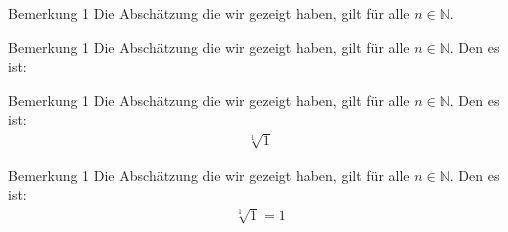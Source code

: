 \documentclass[10pt]{beamer}
\def\bN{\mathbb{N}}
\begin{document}



\begin{frame}{Bemerkung 1}
    Die Abschätzung die wir gezeigt haben, gilt für alle \( n \in \bN \). 
\end{frame}



\begin{frame}{Bemerkung 1}
    Die Abschätzung die wir gezeigt haben, gilt für alle \( n \in \bN \). Den es ist: 
\end{frame}



\begin{frame}{Bemerkung 1}
    Die Abschätzung die wir gezeigt haben, gilt für alle \( n \in \bN \). Den es ist: 
    \begin{align*}
        \sqrt[1]{1}
    \end{align*}
\end{frame}



\begin{frame}{Bemerkung 1}
    Die Abschätzung die wir gezeigt haben, gilt für alle \( n \in \bN \). Den es ist: 
    \begin{align*}
        \sqrt[1]{1}
        = 1
    \end{align*}
\end{frame}
\end{document}
